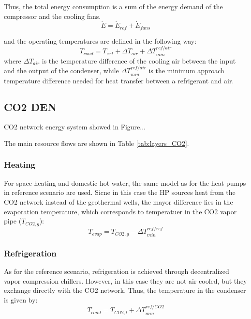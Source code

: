\documentclass{article}
\begin{document}
Thus, the total energy consumption is a sum of the energy demand of the compressor and the cooling fans.
\begin{equation}
\dot{E} = \dot{E}_{ref} + \dot{E}_{fans}
\end{equation}

and the operating temperatures are defined in the following way:
\begin{equation}
    T_{cond} = T_{ext} + \Delta T_{air} + \Delta T_{min}^{ref/air}
\end{equation}
where $\Delta T_{air}$ is the temperature difference of the cooling air between the input and the output of the condenser, while $\Delta T_{min}^{ref/air}$ is the minimum approach temperature difference needed for heat transfer between a refrigerant and air.\\

\subsection{CO2 DEN}
CO2 network energy system showed in Figure...

The main resource flows are shown in Table \ref{tab:layers_CO2}.


\subsubsection{Heating}
For space heating and domestic hot water, the same model as for the heat pumps in reference scenario are used. Sicne in this case the HP sources heat from the CO2 network instead of the geothermal wells, the mayor difference lies in the evaporation temperature, which corresponds to temperatuer in the CO2 vapor pipe ($T_{CO2,g}$):
\begin{equation}
    T_{evap} = T_{CO2,g} - \Delta T_{min}^{ref/ref}
\end{equation}

\subsubsection{Refrigeration}
As for the reference scenario, refrigeration is achieved through decentralized vapor compression chillers. However, in this case they are not air cooled, but they exchange directly with the CO2 network. Thus, the temperature in the condenser is given by:
\begin{equation}
    T_{cond} = T_{CO2,l} + \Delta T_{min}^{ref/CO2}
\end{equation}
\end{document}

